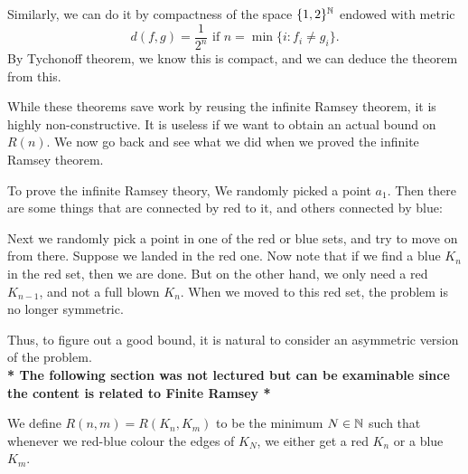 \documentclass[a4paper]{article}
\begin{document}
Similarly, we can do it by compactness of the space $\{1, 2\}^{\mathbb{N}}$ endowed with metric
\[
  d(f, g) = \frac{1}{2^n}\text{ if } n = \min \{i: f_i \not= g_i\}.
\]
By Tychonoff theorem, we know this is compact, and we can deduce the theorem from this. %

While these theorems save work by reusing the infinite Ramsey theorem, it is highly non-constructive. It is useless if we want to obtain an actual bound on $R(n)$. We now go back and see what we did when we proved the infinite Ramsey theorem.

To prove the infinite Ramsey theory, We randomly picked a point $a_1$. Then there are some things that are connected by red to it, and others connected by blue:
\begin{center}
\end{center}
Next we randomly pick a point in one of the red or blue sets, and try to move on from there. Suppose we landed in the red one. Now note that if we find a blue $K_n$ in the red set, then we are done. But on the other hand, we only need a red $K_{n - 1}$, and not a full blown $K_n$. When we moved to this red set, the problem is no longer symmetric.

Thus, to figure out a good bound, it is natural to consider an asymmetric version of the problem.\\
\textbf{* The following section was not lectured but can be examinable since the content is related to Finite Ramsey *}
\begin{defi}
  We define $R(n, m) = R(K_n, K_m)$ to be the minimum $N \in \mathbb{N}$ such that whenever we red-blue colour the edges of $K_N$, we either get a red $K_n$ or a blue $K_m$.
\end{defi}
\end{document}
